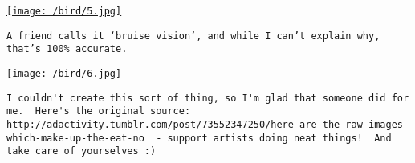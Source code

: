 \href{/bird/5.jpg}{\texttt{[image: /bird/5.jpg]}}

\begin{verbatim}
A friend calls it ‘bruise vision’, and while I can’t explain why, that’s 100% accurate.
\end{verbatim}

\href{/bird/6.jpg}{\texttt{[image: /bird/6.jpg]}}

\begin{verbatim}
I couldn't create this sort of thing, so I'm glad that someone did for me.  Here's the original source: http://adactivity.tumblr.com/post/73552347250/here-are-the-raw-images-which-make-up-the-eat-no  - support artists doing neat things!  And take care of yourselves :)
\end{verbatim}
